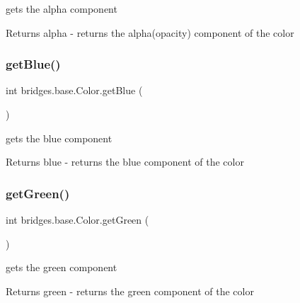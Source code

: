 gets the alpha component

\begin{DoxyReturn}{Returns}
alpha -\/ returns the alpha(opacity) component of the color 
\end{DoxyReturn}
\hypertarget{classbridges_1_1base_1_1_color_ad4b82e1eb9ff59857d2868edd8d4ce65}{}\label{classbridges_1_1base_1_1_color_ad4b82e1eb9ff59857d2868edd8d4ce65} 
\subsubsection{\texorpdfstring{get\+Blue()}{getBlue()}}
{\footnotesize\ttfamily int bridges.\+base.\+Color.\+get\+Blue (\begin{DoxyParamCaption}{ }\end{DoxyParamCaption})}

gets the blue component

\begin{DoxyReturn}{Returns}
blue -\/ returns the blue component of the color 
\end{DoxyReturn}
\hypertarget{classbridges_1_1base_1_1_color_a8f3fdd23cf785704faa2e3701e25978f}{}\label{classbridges_1_1base_1_1_color_a8f3fdd23cf785704faa2e3701e25978f} 
\subsubsection{\texorpdfstring{get\+Green()}{getGreen()}}
{\footnotesize\ttfamily int bridges.\+base.\+Color.\+get\+Green (\begin{DoxyParamCaption}{ }\end{DoxyParamCaption})}

gets the green component

\begin{DoxyReturn}{Returns}
green -\/ returns the green component of the color 
\end{DoxyReturn}
\hypertarget{classbridges_1_1base_1_1_color_af1a30dc925b35d6bfe609f8838651025}{}\label{classbridges_1_1base_1_1_color_af1a30dc925b35d6bfe609f8838651025} 
